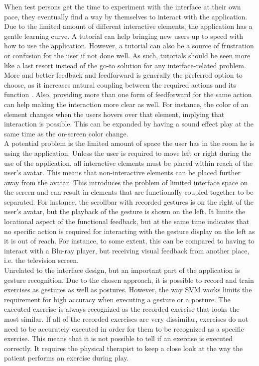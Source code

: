 When test persons get the time to experiment with the interface at their own pace, they eventually find a way by themselves to interact with the application. Due to the limited amount of different interactive elements, the application has a gentle learning curve. A tutorial can help bringing new users up to speed with how to use the application. However, a tutorial can also be a source of frustration or confusion for the user if not done well. As such, tutorials should be seen more like a last resort instead of the go-to solution for any interface-related problem. More and better feedback and feedforward is generally the preferred option to choose, as it increases natural coupling between the required actions and its function \cite{Wensveen2004}. Also, providing more than one form of feedforward for the same action can help making the interaction more clear as well. For instance, the color of an element changes when the users hovers over that element, implying that interaction is possible. This can be expanded by having a sound effect play at the same time as the on-screen color change.\\

A potential problem is the limited amount of space the user has in the room he is using the application. Unless the user is required to move left or right during the use of the application, all interactive elements must be placed within reach of the user's avatar. This means that non-interactive elements can be placed further away from the avatar. This introduces the problem of limited interface space on the screen and can result in elements that are functionally coupled together to be separated. For instance, the scrollbar with recorded gestures is on the right of the user's avatar, but the playback of the gesture is shown on the left. It limits the locational aspect of the functional feedback, but at the same time indicates that no specific action is required for interacting with the gesture display on the left as it is out of reach. For instance, to some extent, this can be compared to having to interact with a Blu-ray player, but receiving visual feedback from another place, i.e. the television screen.\\

Unrelated to the interface design, but an important part of the application is gesture recognition. Due to the chosen approach, it is possible to record and train exercises as gestures as well as postures. However, the way SVM works limits the requirement for high accuracy when executing a gesture or a posture. The executed exercise is always recognized as the recorded exercise that looks the most similar. If all of the recorded exercises are very dissimilar, exercises do not need to be accurately executed in order for them to be recognized as a specific exercise. This means that it is not possible to tell if an exercise is executed correctly. It requires the physical therapist to keep a close look at the way the patient performs an exercise during play.\\

